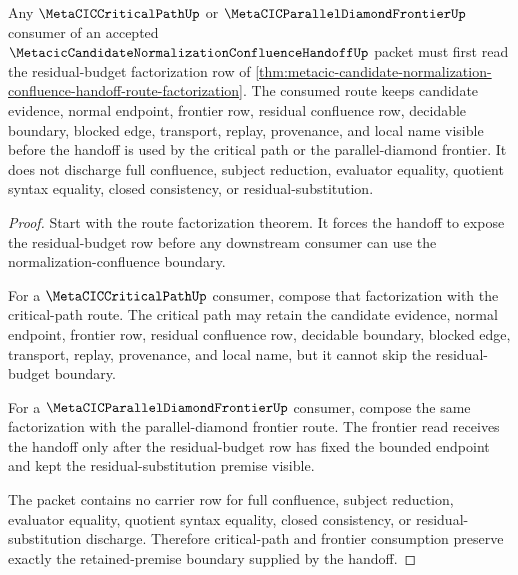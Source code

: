 \begin{theorem}
\label{thm:metacic-candidate-normalization-confluence-handoff-critical-path-consumption}
Any $\MetaCICCriticalPathUp$ or $\MetaCICParallelDiamondFrontierUp$ consumer of an accepted $\MetacicCandidateNormalizationConfluenceHandoffUp$ packet must first read the residual-budget factorization row of \autoref{thm:metacic-candidate-normalization-confluence-handoff-route-factorization}. The consumed route keeps candidate evidence, normal endpoint, frontier row, residual confluence row, decidable boundary, blocked edge, transport, replay, provenance, and local name visible before the handoff is used by the critical path or the parallel-diamond frontier. It does not discharge full confluence, subject reduction, evaluator equality, quotient syntax equality, closed consistency, or residual-substitution.
\end{theorem}
\begin{proof}
Start with the route factorization theorem. It forces the handoff to expose the residual-budget row before any downstream consumer can use the normalization-confluence boundary.

For a $\MetaCICCriticalPathUp$ consumer, compose that factorization with the critical-path route. The critical path may retain the candidate evidence, normal endpoint, frontier row, residual confluence row, decidable boundary, blocked edge, transport, replay, provenance, and local name, but it cannot skip the residual-budget boundary.

For a $\MetaCICParallelDiamondFrontierUp$ consumer, compose the same factorization with the parallel-diamond frontier route. The frontier read receives the handoff only after the residual-budget row has fixed the bounded endpoint and kept the residual-substitution premise visible.

The packet contains no carrier row for full confluence, subject reduction, evaluator equality, quotient syntax equality, closed consistency, or residual-substitution discharge. Therefore critical-path and frontier consumption preserve exactly the retained-premise boundary supplied by the handoff.
\end{proof}

